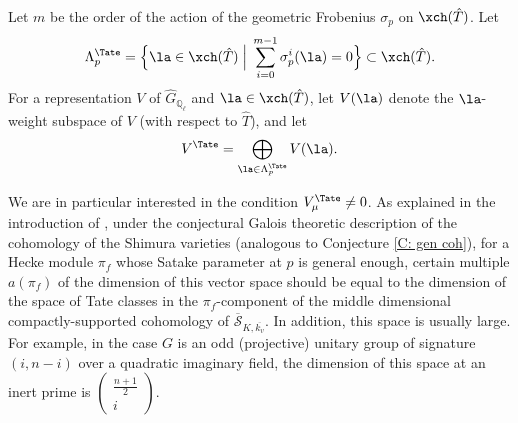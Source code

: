 \documentclass[11pt]{amsart}
\theoremstyle{definition}
\theoremstyle{definition}
\theoremstyle{definition}
\numberwithin{equation}{section}
\newcommand{\bQ}{{\mathbb Q}}
\newcommand{\scrS}{{\mathscr S}}
\begin{document}
Let $m$ be the order of the action of the geometric Frobenius $\sigma_p$ on $\xch(\hat{T})$. Let
\[
\Lambda^\Tate_p=\Big\{\la\in \xch(\hat T)\; \Big|\; \sum_{i=0}^{m-1} \sigma_p^i(\la)=0\Big\}\subset \xch(\hat T).
\]
For a representation $V$ of $\hat G_{\bQ_\ell}$ and $\la\in\xch(\hat T)$, let $V(\la)$ denote the $\la$-weight subspace of $V$ (with respect to $\hat T$), and let
\[
V^\Tate=\bigoplus_{\la\in\Lambda^\Tate_p} V(\la).
\]

We are in particular interested in the condition $V^\Tate_\mu\neq 0$.
As explained in the introduction of \cite{Xiao-Zhu-Cycle}, under the conjectural Galois theoretic description of the cohomology of the Shimura varieties (analogous to Conjecture \ref{C: gen coh}), for a Hecke module $\pi_f$ whose Satake parameter at $p$ is general enough, certain multiple $a(\pi_f)$ of
the dimension of this vector space should be equal to the dimension of the space of Tate classes in the $\pi_f$-component of the middle dimensional compactly-supported cohomology of $\overline{\scrS}_{K,\overline{k_v}}$. 
In addition, this space is usually large. For example, in the case $G$ is an odd (projective) unitary  group of signature $(i,n-i)$ over a quadratic imaginary field, the dimension of this space at an inert prime is $\begin{pmatrix}\frac{n+1}{2}\\ i\end{pmatrix}$.
\end{document}
